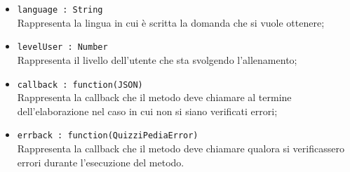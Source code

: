 \begin{itemize}
\begin{itemize}
\begin{itemize}
			\item \texttt{language : String} \\
			Rappresenta la lingua in cui è scritta la domanda che si vuole ottenere;
			\item \texttt{levelUser : Number} \\
			Rappresenta il livello dell'utente che sta svolgendo l'allenamento;
			\item \texttt{callback : function(JSON)} \\
			Rappresenta la callback che il metodo deve chiamare al termine dell'elaborazione nel caso in cui non si siano verificati errori;
			\item \texttt{errback : function(QuizziPediaError)} \\
			Rappresenta la callback che il metodo deve chiamare qualora si verificassero errori durante l'esecuzione del metodo.
			\end{itemize}
		\end{itemize}
\end{itemize}